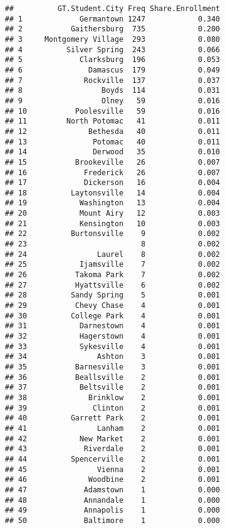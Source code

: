 \documentclass[]{article}
\begin{document}
\begin{verbatim}
##          GT.Student.City Freq Share.Enrollment
## 1             Germantown 1247            0.340
## 2           Gaithersburg  735            0.200
## 3     Montgomery Village  293            0.080
## 4          Silver Spring  243            0.066
## 5             Clarksburg  196            0.053
## 6               Damascus  179            0.049
## 7              Rockville  137            0.037
## 8                  Boyds  114            0.031
## 9                  Olney   59            0.016
## 10           Poolesville   59            0.016
## 11         North Potomac   41            0.011
## 12              Bethesda   40            0.011
## 13               Potomac   40            0.011
## 14               Derwood   35            0.010
## 15           Brookeville   26            0.007
## 16             Frederick   26            0.007
## 17             Dickerson   16            0.004
## 18          Laytonsville   14            0.004
## 19            Washington   13            0.004
## 20            Mount Airy   12            0.003
## 21            Kensington   10            0.003
## 22          Burtonsville    9            0.002
## 23                          8            0.002
## 24                Laurel    8            0.002
## 25            Ijamsville    7            0.002
## 26           Takoma Park    7            0.002
## 27           Hyattsville    6            0.002
## 28          Sandy Spring    5            0.001
## 29           Chevy Chase    4            0.001
## 30          College Park    4            0.001
## 31            Darnestown    4            0.001
## 32            Hagerstown    4            0.001
## 33            Sykesville    4            0.001
## 34                Ashton    3            0.001
## 35           Barnesville    3            0.001
## 36           Beallsville    2            0.001
## 37            Beltsville    2            0.001
## 38              Brinklow    2            0.001
## 39               Clinton    2            0.001
## 40          Garrett Park    2            0.001
## 41                Lanham    2            0.001
## 42            New Market    2            0.001
## 43             Riverdale    2            0.001
## 44          Spencerville    2            0.001
## 45                Vienna    2            0.001
## 46              Woodbine    2            0.001
## 47             Adamstown    1            0.000
## 48             Annandale    1            0.000
## 49             Annapolis    1            0.000
## 50             Baltimore    1            0.000

\end{verbatim}
\end{document}
